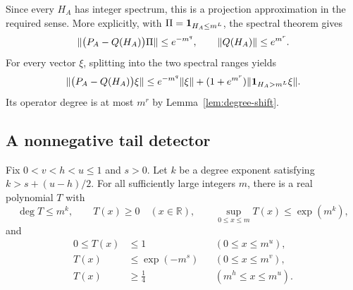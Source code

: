 Since every $H_A$ has integer spectrum, this is a projection
approximation in the required sense.  More explicitly, with
$\Pi=\mathbf 1_{H_A\le m^L}$, the spectral theorem gives
\[
 \lVert\bigl(P_A-Q(H_A)\bigr)\Pi\rVert\le e^{-m^q},
 \qquad \lVert Q(H_A)\rVert\le e^{m^r}.
\]
For every vector $\xi$, splitting into the two spectral ranges yields
\begin{equation}
 \lVert\bigl(P_A-Q(H_A)\bigr)\xi\rVert
 \le e^{-m^q}\lVert\xi\rVert
    +(1+e^{m^r})\lVert\mathbf 1_{H_A>m^L}\xi\rVert.
 \label{eq:zero-filter-vector}
\end{equation}
Its operator degree is at most $m^r$ by
Lemma~\ref{lem:degree-shift}.

\subsection{A nonnegative tail detector}

\begin{lemma}
\label{lem:tail-filter}
Fix $0<v<h<u\le1$ and $s>0$.  Let $k$ be a degree exponent satisfying
$k>s+(u-h)/2$.  For all sufficiently large integers $m$, there is a real
polynomial $T$ with
\[
 \deg T\le m^k,\qquad
 T(x)\ge0\quad(x\in\mathbb R),\qquad
 \sup_{0\le x\le m}T(x)\le\exp(m^k),
\]
and
\begin{align*}
 0\le T(x)&\le1 &&(0\le x\le m^u),\\
 T(x)&\le\exp(-m^s) &&(0\le x\le m^v),\\
 T(x)&\ge\tfrac14 &&(m^h\le x\le m^u).
\end{align*}
\end{lemma}

